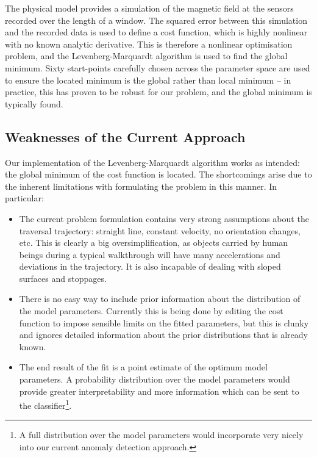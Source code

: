 \documentclass[10pt, a4paper, twocolumn]{article} %
\begin{document}
The physical model provides a simulation of the magnetic field at the sensors recorded over the length of a window. The squared error between this simulation and the recorded data is used to define a cost function, which is highly nonlinear with no known analytic derivative. This is therefore a nonlinear optimisation problem, and the Levenberg-Marquardt algorithm is used to find the global minimum. Sixty start-points carefully chosen across the parameter space are used to ensure the located minimum is the global rather than local minimum – in practice, this has proven to be robust for our problem, and the global minimum is typically found.

\subsection{Weaknesses of the Current Approach}

Our implementation of the Levenberg-Marquardt algorithm works as intended: the global minimum of the cost function is located. The shortcomings arise due to the inherent limitations with formulating the problem in this manner. In particular:

\begin{itemize}
	\item The current problem formulation contains very strong assumptions about the traversal trajectory: straight line, constant velocity, no orientation changes, etc. This is clearly a big oversimplification, as objects carried by human beings during a typical walkthrough will have many accelerations and deviations in the trajectory. It is also incapable of dealing with sloped surfaces and stoppages.
	
	\item There is no easy way to include prior information about the distribution of the model parameters. Currently this is being done by editing the cost function to impose sensible limits on the fitted parameters, but this is clunky and ignores detailed information about the  prior distributions that is already known.
	
	\item The end result of the fit is a point estimate of the optimum model parameters. A probability distribution over the model parameters would provide greater interpretability and more information which can be sent to the classifier\footnote{A full distribution over the model parameters would incorporate very nicely into our current anomaly detection approach.}.
\end{itemize}
\end{document}
